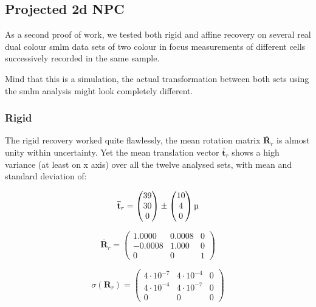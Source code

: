 \documentclass[11pt, a4paper, oneside, twocolumn]{report}
\renewcommand{\b}{\textbf}
\newcommand{\m}{\mathrm}
\begin{document}
\subsection{Projected 2d NPC}

As a second proof of work, we tested both rigid and affine recovery on
several real dual colour \gls{smlm} data sets of two colour in focus
measurements of different cells successively recorded in the same
sample.

Mind that this is a simulation, the actual transformation between both
sets using the \gls{smlm} analysis might look completely different.


\subsubsection{Rigid}

The rigid recovery worked quite flawlessly, the mean rotation matrix
$\overline{\b{R}}_r$ is almost unity within uncertainty. Yet the mean
translation vector $\overline{\b{t}}_r$ shows a high variance (at
least on x axis) over all the twelve analysed sets, with mean and
standard deviation of:

\begin{equation}
  \overline{\b{t}}_r=
  \begin{pmatrix}
    39 \\
    30 \\
    0 \\
  \end{pmatrix}
  \pm
  \begin{pmatrix}
    10 \\
    4 \\
    0 \\
  \end{pmatrix}
  \si{\micro\m}
\end{equation}

\begin{equation}
  \overline{\b{R}}_r =
  \begin{pmatrix}
    1.0000 & 0.0008 & 0 \\
    -0.0008 & 1.000 & 0 \\
    0 & 0 & 1
  \end{pmatrix}
\end{equation}

\begin{equation}
  \sigma( \b{R}_r ) =
  \begin{pmatrix}
    4\cdot10^{-7} & 4\cdot10^{-4} & 0 \\
    4\cdot10^{-4} & 4\cdot10^{-7} & 0 \\
    0 & 0 & 0
  \end{pmatrix}
\end{equation}
\end{document}
